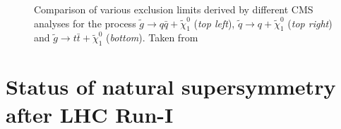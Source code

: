 \begin{figure}[!h]
  \caption{Comparison of various exclusion limits derived by different CMS analyses for the process $\tilde{g} \rightarrow q\bar{q} + \tilde{\chi}_1^0$ (\textit{top left}), $\tilde{q} \rightarrow q + \tilde{\chi}_1^0$ (\textit{top right}) and $\tilde{g} \rightarrow t\bar{t} + \tilde{\chi}_1^0$ (\textit{bottom}). Taken from~\cite{bib:CMS:PhysicsResultsSUS}}
  \label{fig:result_comp}
\end{figure}




\section{Status of natural supersymmetry after LHC Run-I}
\label{sec:susy_status}


